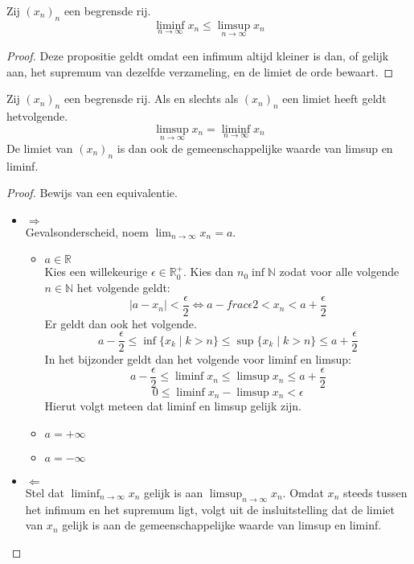 \documentclass[main.tex]{subfiles}
\begin{document}
\begin{bpr}
  Zij $(x_{n})_{n}$ een begrensde rij.
  \[ \liminf_{n\rightarrow \infty} x_{n} \le \limsup_{n\rightarrow \infty} x_{n} \]

  \begin{proof}
    Deze propositie geldt omdat een infimum altijd kleiner is dan, of gelijk aan, het supremum van dezelfde verzameling, en de limiet de orde bewaart.
  \end{proof}
\end{bpr}


\begin{bpr}
  Zij $(x_{n})_{n}$ een begrensde rij.
  Als en slechts als $(x_{n})_{n}$ een limiet heeft geldt hetvolgende.
  \[ \limsup_{n\rightarrow \infty} x_{n} = \liminf_{n\rightarrow \infty} x_{n} \]
  De limiet van $(x_{n})_{n}$ is dan ook de gemeenschappelijke waarde van limsup en liminf.

  \begin{proof}
    Bewijs van een equivalentie.
    \begin{itemize}
    \item $\Rightarrow$\\
      Gevalsonderscheid, noem $\lim_{n\rightarrow \infty}x_{n} = a$.
      \begin{itemize}
      \item $a\in \mathbb{R}$\\
        Kies een willekeurige $\epsilon \in \mathbb{R}_{0}^{+}$.
        Kies dan $n_{0}\inf \mathbb{N}$ zodat voor alle volgende $n\in \mathbb{N}$ het volgende geldt:
        \[ |a - x_{n}| < \frac{\epsilon}{2} \Leftrightarrow a-frac{\epsilon}{2} < x_{n} < a + \frac{\epsilon}{2} \]
        Er geldt dan ook het volgende.
        \[ a-\frac{\epsilon}{2} \le \inf\{x_{k}\mid k>n\}\le \sup\{x_{k}\mid k>n\} \le a + \frac{\epsilon}{2} \]
        In het bijzonder geldt dan het volgende voor liminf en limsup:
        \[ a-\frac{\epsilon}{2} \le \liminf x_{n}\le \limsup x_{n} \le a + \frac{\epsilon}{2} \]
        \[ 0  \le \liminf x_{n} - \limsup x_{n} < \epsilon \]
        Hierut volgt meteen dat liminf en limsup gelijk zijn.
      \item $a=+\infty$
      \item $a=-\infty$
      \end{itemize}
    \item $\Leftarrow$\\
      Stel dat $\liminf_{n\rightarrow \infty} x_{n}$ gelijk is aan $\limsup_{n\rightarrow \infty} x_{n}$.
      Omdat $x_{n}$ steeds tussen het infimum en het supremum ligt, volgt uit de insluitstelling dat de limiet van $x_{n}$ gelijk is aan de gemeenschappelijke waarde van limsup en liminf.
    \end{itemize}
  \end{proof}
\end{bpr}
\end{document}
